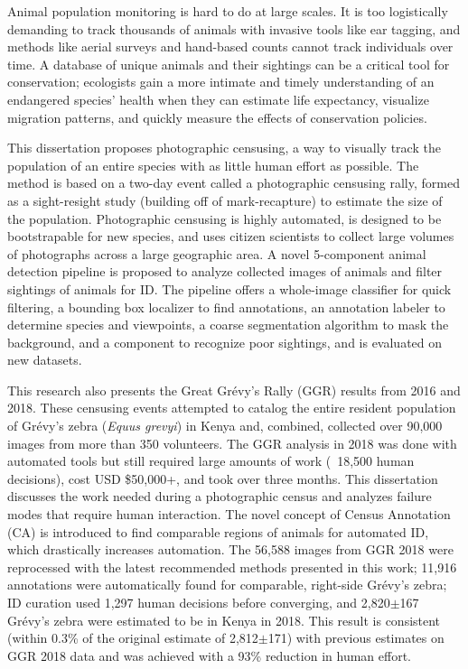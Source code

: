 
\noindent Animal population monitoring is hard to do at large scales.  It is too logistically demanding to track thousands of animals with invasive tools like ear tagging, and methods like aerial surveys and hand-based counts cannot track individuals over time.  A database of unique animals and their sightings can be a critical tool for conservation; ecologists gain a more intimate and timely understanding of an endangered species' health when they can estimate life expectancy, visualize migration patterns, and quickly measure the effects of conservation policies.

This dissertation proposes photographic censusing, a way to visually track the population of an entire species with as little human effort as possible.  The method is based on a two-day event called a photographic censusing rally, formed as a sight-resight study (building off of mark-recapture) to estimate the size of the population.  Photographic censusing is highly automated, is designed to be bootstrapable for new species, and uses citizen scientists to collect large volumes of photographs across a large geographic area.  A novel 5-component animal detection pipeline is proposed to analyze collected images of animals and filter sightings of animals for ID.  The pipeline offers a whole-image classifier for quick filtering, a bounding box localizer to find annotations, an annotation labeler to determine species and viewpoints, a coarse segmentation algorithm to mask the background, and a component to recognize poor sightings, and is evaluated on new datasets.

This research also presents the Great Gr\'evy's Rally (GGR) results from 2016 and 2018.  These censusing events attempted to catalog the entire resident population of Gr\'evy's zebra (\textit{Equus grevyi}) in Kenya and, combined, collected over 90,000 images from more than 350 volunteers.  The GGR analysis in 2018 was done with automated tools but still required large amounts of work (~18,500 human decisions), cost USD \$50,000+, and took over three months.  This dissertation discusses the work needed during a photographic census and analyzes failure modes that require human interaction.  The novel concept of Census Annotation (CA) is introduced to find comparable regions of animals for automated ID, which drastically increases automation.  The 56,588 images from GGR 2018 were reprocessed with the latest recommended methods presented in this work; 11,916 annotations were automatically found for comparable, right-side Gr\'evy's zebra; ID curation used 1,297 human decisions before converging, and 2,820$\pm$167 Gr\'evy's zebra were estimated to be in Kenya in 2018.  This result is consistent (within 0.3\% of the original estimate of 2,812$\pm$171) with previous estimates on GGR 2018 data and was achieved with a 93\% reduction in human effort.
